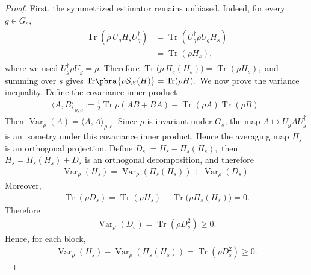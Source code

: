 \documentclass[prl,aps,notitlepage,superscriptaddress,showpacs,nofootinbib]{revtex4-2}
\begin{document}
{\begin{proof}
First, the symmetrized estimator remains unbiased. Indeed, for every \(g\in G_s\),
\begin{align}
    \begin{aligned}
    \operatorname{Tr}\left(\rho\,U_gH_sU_g^\dagger\right)
    &=
    \operatorname{Tr}\left(U_g^\dagger\rho U_g H_s\right)  \\
    &=
    \operatorname{Tr}(\rho H_s),
\end{aligned}
\end{align}
where we used \(U_g^\dagger\rho U_g=\rho\). Therefore
$   \operatorname{Tr}\bigl(\rho\,\Pi_s(H_s)\bigr)
    =
    \operatorname{Tr}(\rho H_s),$
and summing over \(s\) gives
$ \mathrm{Tr}\pbra{\rho \mathcal{S}_{\mathcal{X}}(H)}=\mathrm{Tr}(\rho H).$
We now prove the variance inequality. Define the covariance inner product
\begin{align}
        \langle A,B\rangle_{\rho,c}
    :=
    \frac12\operatorname{Tr}\rho(AB+BA)
    -
    \operatorname{Tr}(\rho A)\operatorname{Tr}(\rho B).
\end{align}
Then $    \operatorname{Var}_\rho(A)=\langle A,A\rangle_{\rho,c}.$
Since \(\rho\) is invariant under \(G_s\), the map $ A\mapsto U_gAU_g^\dagger$
is an isometry under this covariance inner product. Hence the averaging map \(\Pi_s\) is an orthogonal projection. 
Define $D_s:=H_s-\Pi_s(H_s),$ then $ H_s=\Pi_s(H_s)+D_s$
is an orthogonal decomposition, and therefore
\begin{align}
        \operatorname{Var}_\rho(H_s)
    =
    \operatorname{Var}_\rho(\Pi_s(H_s))
    +
    \operatorname{Var}_\rho(D_s).
\end{align}
Moreover,
\begin{align}
        \operatorname{Tr}(\rho D_s)
    =
    \operatorname{Tr}(\rho H_s)
    -
    \operatorname{Tr}\bigl(\rho\Pi_s(H_s)\bigr)
    =
    0.
\end{align}
Therefore
\begin{align}
        \operatorname{Var}_\rho(D_s)
    =
    \operatorname{Tr}(\rho D_s^2)
    \ge 0.
\end{align}
Hence, for each block,
\begin{align}
        \operatorname{Var}_\rho(H_s)
    -
    \operatorname{Var}_\rho(\Pi_s(H_s))
    =
    \operatorname{Tr}(\rho D_s^2)
    \ge 0.
\end{align}

\end{proof}}
\end{document}
